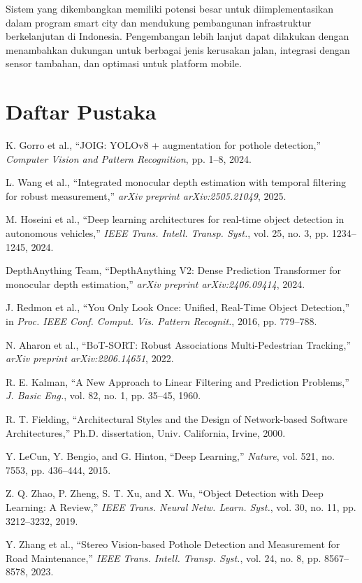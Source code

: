 \documentclass[12pt,a4paper]{article}
\begin{document}
Sistem yang dikembangkan memiliki potensi besar untuk diimplementasikan dalam program smart city dan mendukung pembangunan infrastruktur berkelanjutan di Indonesia. Pengembangan lebih lanjut dapat dilakukan dengan menambahkan dukungan untuk berbagai jenis kerusakan jalan, integrasi dengan sensor tambahan, dan optimasi untuk platform mobile.

\section*{Daftar Pustaka}

\begin{thebibliography}{99}

K. Gorro et al., ``JOIG: YOLOv8 + augmentation for pothole detection,'' \textit{Computer Vision and Pattern Recognition}, pp. 1--8, 2024.

L. Wang et al., ``Integrated monocular depth estimation with temporal filtering for robust measurement,'' \textit{arXiv preprint arXiv:2505.21049}, 2025.

M. Hoseini et al., ``Deep learning architectures for real-time object detection in autonomous vehicles,'' \textit{IEEE Trans. Intell. Transp. Syst.}, vol. 25, no. 3, pp. 1234--1245, 2024.

DepthAnything Team, ``DepthAnything V2: Dense Prediction Transformer for monocular depth estimation,'' \textit{arXiv preprint arXiv:2406.09414}, 2024.

J. Redmon et al., ``You Only Look Once: Unified, Real-Time Object Detection,'' in \textit{Proc. IEEE Conf. Comput. Vis. Pattern Recognit.}, 2016, pp. 779--788.

N. Aharon et al., ``BoT-SORT: Robust Associations Multi-Pedestrian Tracking,'' \textit{arXiv preprint arXiv:2206.14651}, 2022.

R. E. Kalman, ``A New Approach to Linear Filtering and Prediction Problems,'' \textit{J. Basic Eng.}, vol. 82, no. 1, pp. 35--45, 1960.

R. T. Fielding, ``Architectural Styles and the Design of Network-based Software Architectures,'' Ph.D. dissertation, Univ. California, Irvine, 2000.

Y. LeCun, Y. Bengio, and G. Hinton, ``Deep Learning,'' \textit{Nature}, vol. 521, no. 7553, pp. 436--444, 2015.

Z. Q. Zhao, P. Zheng, S. T. Xu, and X. Wu, ``Object Detection with Deep Learning: A Review,'' \textit{IEEE Trans. Neural Netw. Learn. Syst.}, vol. 30, no. 11, pp. 3212--3232, 2019.

Y. Zhang et al., ``Stereo Vision-based Pothole Detection and Measurement for Road Maintenance,'' \textit{IEEE Trans. Intell. Transp. Syst.}, vol. 24, no. 8, pp. 8567--8578, 2023.

\end{thebibliography}
\end{document}
